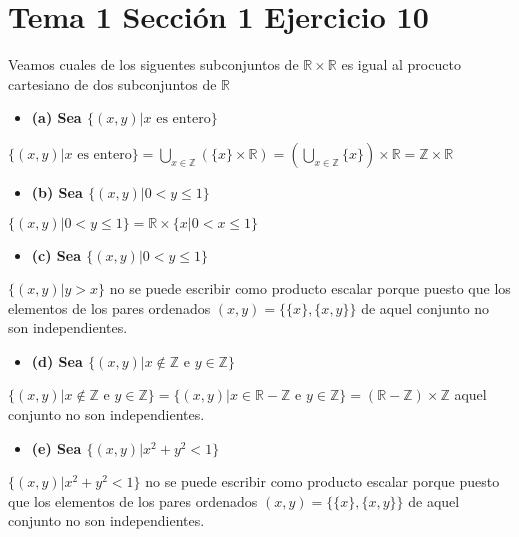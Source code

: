 \documentclass{article}
\begin{document}
\section{Tema 1 Sección 1 Ejercicio 10}
Veamos cuales de los siguentes subconjuntos de $\mathbb{R}\times \mathbb{R}$ es igual al procucto cartesiano de dos subconjuntos de $\mathbb{R}$
\begin{itemize}
\item \bf (a) \rm Sea $\{(x,y)| x\text{ es entero}\}$
\end{itemize}
$\{(x,y)| x\text{ es entero}\}=\bigcup_{x\in \mathbb{Z}}(\{x\}\times \mathbb{R})=(\bigcup_{x\in \mathbb{Z}}\{x\})\times \mathbb{R}=\mathbb{Z}\times \mathbb{R}$
\begin{itemize}
\item \bf (b) \rm Sea $\{(x,y)| 0<y\leq 1\}$
\end{itemize}
$\{(x,y)| 0<y\leq 1\}= \mathbb{R}\times \{x|0<x\leq 1\}$
\begin{itemize}
\item \bf (c) \rm Sea $\{(x,y)| 0<y\leq 1\}$
\end{itemize}
$\{(x,y)| y>x\}$ no se puede escribir como producto escalar porque puesto que los elementos de los pares ordenados $(x,y)=\{\{x\},\{x,y\}\}$ de aquel conjunto no son independientes.
\begin{itemize}
\item \bf (d) \rm Sea $\{(x,y)| x\notin \mathbb{Z} \text{ e } y\in \mathbb{Z}\}$
\end{itemize}
$\{(x,y)| x\notin \mathbb{Z} \text{ e } y\in \mathbb{Z}\}=\{(x,y)| x\in \mathbb{R}-\mathbb{Z} \text{ e } y\in \mathbb{Z}\}= (\mathbb{R}-\mathbb{Z})\times \mathbb{Z}$ aquel conjunto no son independientes.
\begin{itemize}
\item \bf (e) \rm Sea $\{(x,y)| x^2+y^2< 1\}$
\end{itemize}
$\{(x,y)| x^2+y^2< 1\}$ no se puede escribir como producto escalar porque puesto que los elementos de los pares ordenados $(x,y)=\{\{x\},\{x,y\}\}$ de aquel conjunto no son independientes.
\end{document}
